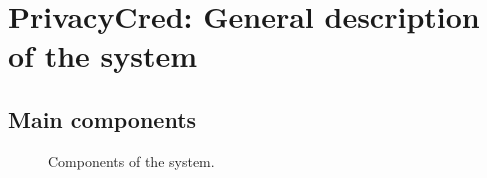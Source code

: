 \documentclass[a4paper,12pt,english,openany]{sphinxmanual}
\begin{document}
\section{PrivacyCred: General description of the system}
\label{\detokenize{privacycred:privacycred-general-description-of-the-system}}

\subsection{Main components}
\label{\detokenize{privacycred:main-components}}
\begin{figure}[htbp]
\centering
\capstart

\noindent{}
\caption{Components of the system.}\label{\detokenize{privacycred:id2}}\end{figure}
\end{document}
